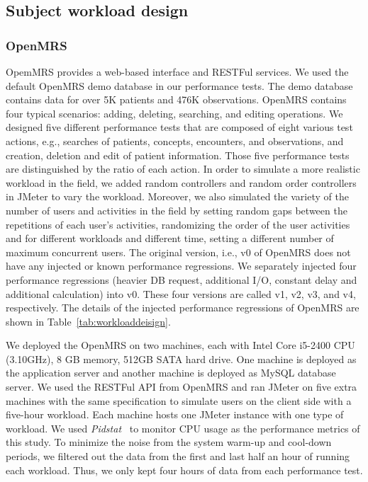 \subsection{Subject workload design}
\subsubsection{OpenMRS}
OpemMRS provides a web-based interface and RESTFul services. We used the default OpenMRS demo database in our performance tests. The demo database contains data for over 5K patients and 476K observations. OpenMRS contains four typical scenarios: adding, deleting, searching, and editing operations. We designed five different performance tests that are composed of eight various test actions, e.g., searches of patients, concepts, encounters, and observations, and creation, deletion and edit of patient information. Those five performance tests are distinguished by the ratio of each action. In order to simulate a more realistic workload in the field, we added random controllers and random order controllers in JMeter to vary the workload. Moreover, we also simulated the variety of the number of users and activities in the field by setting random gaps between the repetitions of each user’s activities, randomizing the order of the user activities and for different workloads and different time, setting a different number of maximum concurrent users. The original version, i.e., v0 of OpenMRS does not have any injected or known performance regressions. We separately injected four performance regressions (heavier DB request, additional I/O, constant delay and additional calculation) into v0. These four versions are called v1, v2, v3, and v4, respectively. The details of the injected performance regressions of OpenMRS are shown in Table~\ref{tab:workloaddeisign}.

We deployed the OpenMRS on two machines, each with Intel Core i5-2400 CPU (3.10GHz), 8 GB memory, 512GB SATA hard drive. One machine is deployed as the application server and another machine is deployed as MySQL database server. We used the RESTFul API from OpenMRS and ran JMeter on five extra machines with the same specification to simulate users on the client side with a five-hour workload. Each machine hosts one JMeter instance with one type of workload. We used \emph{Pidstat}~\citep{pidstat} to monitor CPU usage as the performance metrics of this study.
To minimize the noise from the system warm-up and cool-down periods, we filtered out the data from the first and last half an hour of running each workload. Thus, we only kept four hours of data from each performance test.


